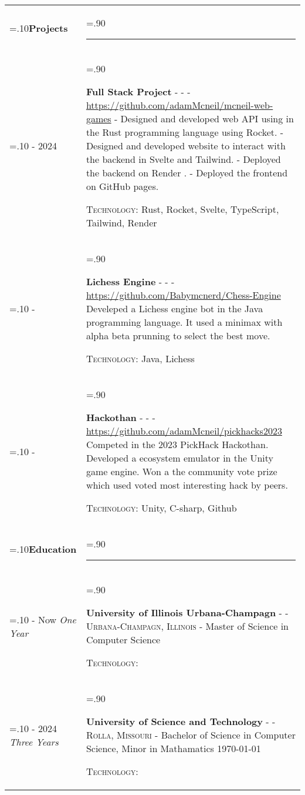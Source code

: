 \documentclass[10pt]{article}
\newcommand{\timeFrame}[3] {
  \if\relax\detokenize{#2}\relax
    #1
  \else
    #1 - #2
  \fi
  \newline
  \scriptsize \textit{#3}
}
\newcommand{\entry}[6] {
  \textbf{#1}
  \if\relax\detokenize{#2}\relax
  \else
       - \textsc{#2}
  \fi
  \if\relax\detokenize{#3}\relax
  \else
      - \textsc{#3}
  \fi
  \if\relax\detokenize{#4}\relax
  \else
      - \href{https://#4}{#4}
  \fi
  \newline #5
  \if\relax\detokenize{#6}\relax
  \else
      \newline \textsc{Technology:} #6
  \fi
  \\
}
\newcommand{\horizontalLine}[0] {
    \noindent\rule{.90\linewidth}{0.4pt}
}
\begin{document}
\begin{tabularx}{\linewidth}{>{\hsize=.10\hsize}X>{\hsize=.90\hsize}X}
\textbf{Projects} & \horizontalLine \\

\timeFrame{2023}{2024}{} &
\entry{Full Stack Project}
  {}
  {}
  {https://github.com/adamMcneil/mcneil-web-games}
  {
  - Designed and developed web API using in the Rust programming language using Rocket. \newline
  - Designed and developed website to interact with the backend in Svelte and Tailwind. \newline
  - Deployed the backend on Render . \newline
  - Deployed the frontend on GitHub pages.
  }
  {Rust, Rocket, Svelte, TypeScript, Tailwind, Render \newline}

\timeFrame{2021}{}{} &
\entry{Lichess Engine}
  {}
  {}
  {https://github.com/Babymcnerd/Chess-Engine }
  {
    Develeped a Lichess engine bot in the Java programming language. 
    It used a minimax with alpha beta prunning to select the best move.
  }
  {Java, Lichess \newline}

\timeFrame{2023}{}{} &
\entry{Hackothan}
  {}
  {}
  {https://github.com/adamMcneil/pickhacks2023}
  {
    Competed in the 2023 PickHack Hackothan.
    Developed a ecosystem emulator in the Unity game engine.
    Won a the community vote prize which used voted most interesting hack by peers.
  }
  {Unity, C-sharp, Github \newline}

\textbf{Education} & \horizontalLine \\

\timeFrame{2024}{Now}{One Year} &
\entry{University of Illinois Urbana-Champagn}
  {}
  {Urbana-Champagn, Illinois}
  {}
  {
  Master of Science in Computer Science %
  }
  {}

\timeFrame{2021}{2024}{Three Years} &
\entry{University of Science and Technology}
  {}
  {Rolla, Missouri}
  {}
  {
  Bachelor of Science in Computer Science, Minor in Mathamatics \hfill \today
  }
  {}

\end{tabularx}
\end{document}
